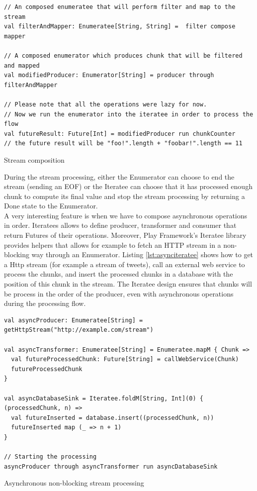 \begin{listing}[h]
\begin{verbatim}
// An composed enumeratee that will perform filter and map to the stream
val filterAndMapper: Enumeratee[String, String] =  filter compose mapper

// A composed enumerator which produces chunk that will be filtered and mapped
val modifiedProducer: Enumerator[String] = producer through filterAndMapper

// Please note that all the operations were lazy for now.
// Now we run the enumerator into the iteratee in order to process the flow
val futureResult: Future[Int] = modifiedProducer run chunkCounter
// the future result will be "foo!".length + "foobar!".length == 11
\end{verbatim}
\caption{Stream composition}
\label{lst:iterateecompo}
\end{listing}

During the stream processing, either the Enumerator can choose to end the stream (sending an EOF) or the Iteratee can choose that it has processed enough
chunk to compute its final value and stop the stream processing by returning a Done state to the Enumerator.
\\

A very interesting feature is when we have to compose asynchronous operations in order. Iteratees allows to define
producer, transformer and consumer that return Futures of their operations. Moreover, Play Framework's Iteratee library
provides helpers that allows for example to fetch an HTTP stream in a non-blocking way through an Enumerator.
Listing \ref{lst:asynciteratee} shows how to get a Http stream (for example a stream of tweets), call an external web service to process
the chunks, and insert the processed chunks in a database with the position of this chunk in the stream. 
The Iteratee design ensures that chunks will be process in the order of the producer, even with asynchronous
operations during the processing flow.

\begin{listing}[h]
\begin{verbatim}
val asyncProducer: Enumeratee[String] = getHttpStream("http://example.com/stream")

val asyncTransformer: Enumeratee[String] = Enumeratee.mapM { Chunk => 
  val futureProcessedChunk: Future[String] = callWebService(Chunk)
  futureProcessedChunk
}

val asyncDatabaseSink = Iteratee.foldM[String, Int](0) { (processedChunk, n) =>
  val futureInserted = database.insert((processedChunk, n))
  futureInserted map (_ => n + 1)
}

// Starting the processing
asyncProducer through asyncTransformer run asyncDatabaseSink
\end{verbatim}
\caption{Asynchronous non-blocking stream processing}
\label{lst:asynciteratee}
\end{listing}


